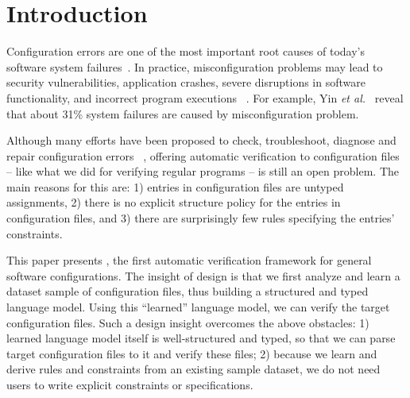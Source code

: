 \section{Introduction}
\label{sec-intro}

Configuration errors are one of the most important root causes of
today's software system failures~\cite{xu15systems, yin11anempirical}.
In practice, misconfiguration problems may lead to security
vulnerabilities, application crashes, severe disruptions in software
functionality, and incorrect program executions%
~\cite{zhang14encore, yuan11context, xu13do, xu15hey}.  
For example, Yin {\em et al.}~\cite{yin11anempirical} reveal
that about 31\% system failures are caused by misconfiguration problem. 

Although many efforts have been proposed 
to check, troubleshoot, diagnose and repair configuration errors%
~\cite{wang04automatic, attariyan10automating,
su07autobash, whitaker04configuration}, 
offering automatic verification to configuration files -- like what we
did for verifying regular programs -- is still an open problem.
The main reasons for this are:
1) entries in configuration files are untyped assignments, 2) there
is no explicit structure policy for the entries in configuration
files, and 3) there are surprisingly few rules specifying the
entries' constraints.


This paper presents \app, the first automatic verification framework
for general software configurations.
The insight of \app design is that we first analyze and learn 
a dataset sample of configuration files, thus building 
a structured and typed language model. Using this ``learned'' language
model, we can verify the target configuration files.
Such a design insight overcomes the above obstacles:
1) learned language model itself is well-structured and typed, so
that we can parse target configuration files to it and verify these
files; 2) because we learn and derive rules and constraints 
from an existing sample dataset, 
we do not need users to write explicit constraints or specifications.

